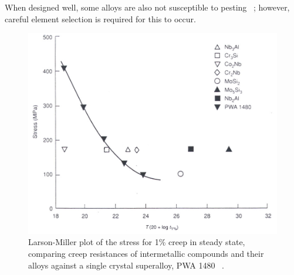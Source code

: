 When designed well, some alloys are also not susceptible to pesting ~\cite{anton92, nesbitt93}; however, careful element selection is required for this to occur.
%
\begin{figure}[H]
\begin{center}
\includegraphics[width=12cm]{LMplotforintermetallics}
\caption{Larson-Miller plot of the stress for 1\% creep in steady state, comparing creep resistances of intermetallic compounds and their alloys against a single crystal superalloy, PWA 1480 ~\cite{anton89, anton89b, shah95}.}
\label{fig:LMplotforintermetallics}
\end{center}
\end{figure}
%
%
